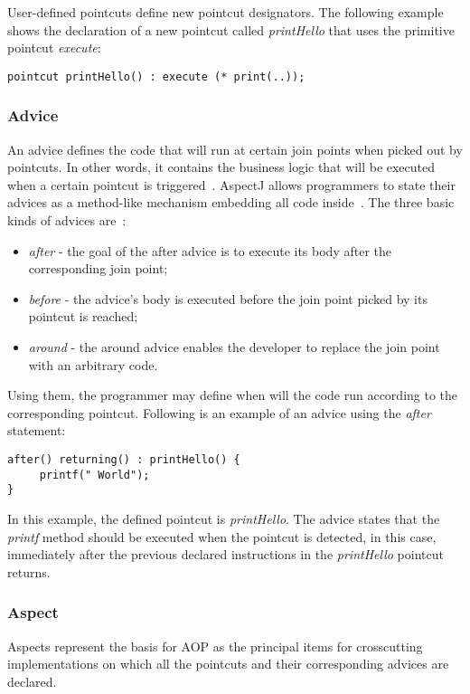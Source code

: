 \documentclass{template}
\begin{document}
User-defined pointcuts define new pointcut designators. The following example shows the declaration of a new pointcut called \textit{printHello} that uses the primitive pointcut \textit{execute}: 

\verb!pointcut printHello() : execute (* print(..));!

\subsubsection{Advice}

An advice defines the code that will run at certain join points when picked out by pointcuts. In other words, it contains the business logic that will be executed when a certain pointcut is triggered~\cite{Kiselev2002}. AspectJ allows programmers to state their advices as a method-like mechanism embedding all code inside~\cite{Kiczales97aspect-orientedprogramming}. The three basic kinds of advices are~\cite{Kiselev2002}:

\begin{itemize}
\item \textit{after} - the goal of the after advice is to execute its body after the corresponding join point;
\item \textit{before} - the advice's body is executed before the join point picked by its pointcut is reached;
\item \textit{around} - the around advice enables the developer to replace the join point with an arbitrary code.
\end{itemize}

Using them, the programmer may define when will the code run according to the corresponding pointcut. Following is an example of an advice using the \textit{after} statement:

\verb!after() returning() : printHello() {!\\
\verb!     printf(" World");!\\
\verb!}!

In this example, the defined pointcut is \textit{printHello}. The advice states that the \textit{printf} method should be executed when the pointcut is detected, in this case, immediately after the previous declared instructions in the \textit{printHello} pointcut returns.

\subsubsection{Aspect}

Aspects represent the basis for AOP as the principal items for crosscutting implementations on which all the pointcuts and their corresponding advices are declared. 
\end{document}
